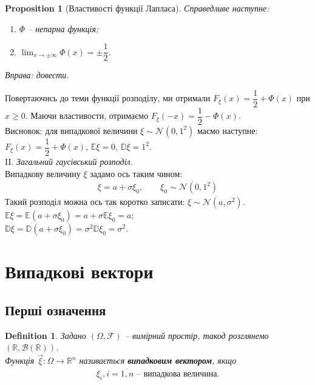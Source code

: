 \documentclass[a4paper, 10pt]{article}
\theoremstyle{theoremdd}
\newtheorem{definition}[theorem]{Definition}
\newtheorem{proposition}[theorem]{Proposition}
\begin{document}
\begin{proposition}[Властивості функції Лапласа]
Справедливе наступне:
\begin{enumerate}[nosep,wide=0pt,label={\arabic*)}]
\item $\Phi$ -- непарна функція;
\item $\displaystyle\lim_{x \to \pm \infty} \Phi(x) = \pm \dfrac{1}{2}$.
\end{enumerate}
\noindent
\textit{Вправа: довести.}
\end{proposition}
\noindent
Повертаючись до теми функції розподілу, ми отримали $F_\xi(x) = \dfrac{1}{2} + \Phi(x)$ при $x \geq 0$. Маючи властивости, отримаємо $F_\xi(-x) = \dfrac{1}{2} - \Phi(x)$.
\bigskip \\
Висновок: для випадкової величини $\xi \sim \mathcal{N}(0,1^2)$ маємо наступне:\\
$F_\xi(x) = \dfrac{1}{2} + \Phi(x)$, \qquad $\mathbb{E}\xi = 0$, \qquad $\mathbb{D}\xi = 1^2$.
\bigskip \\
II. \textit{Загальний гаусівський розподіл}.\\
Випадкову величину $\xi$ задамо ось таким чином:
\begin{align*}
\xi = a + \sigma \xi_0, \qquad \xi_0 \sim \mathcal{N}(0,1^2)
\end{align*}
\noindent
Такий розподіл можна ось так коротко записати: $\xi \sim \mathcal{N}(a,\sigma^2)$.\\
$\mathbb{E}\xi = \mathbb{E}(a + \sigma \xi_0) = a + \sigma \mathbb{E}\xi_0 = a$;\\
$\mathbb{D}\xi = \mathbb{D}(a +\sigma \xi_0) = \sigma^2 \mathbb{D}\xi_0 = \sigma^2$.
\newpage

\section{Випадкові вектори}
\subsection{Перші означення}
\begin{definition}
Задано $(\Omega,\mathcal{F})$ -- вимірний простір, такод розглянемо $(\mathbb{R}, \mathcal{B}(\mathbb{R}))$.\\
Функція $\vec{\xi} \colon \Omega \to \mathbb{R}^n$ називається \textbf{випадковим вектором}, якщо
\begin{align*}
\xi_i, i = \overline{1,n} \text{ -- випадкова величина.}
\end{align*}
\end{definition}
\end{document}

